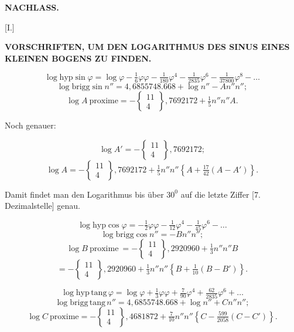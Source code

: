 
\clearpage{}




\begin{center}
\textbf{NACHLASS.}
\end{center}

\begin{center}
[I.]
\end{center}

\begin{center}
\textbf{VORSCHRIFTEN, UM DEN LOGARITHMUS DES SINUS EINES
KLEINEN BOGENS ZU FINDEN.}
\end{center}

\[
\log\mathrm{hyp}\sin\varphi = \log\varphi - \tfrac{1}{6}\varphi\varphi - \tfrac{1}{180}\varphi^4 - \tfrac{1}{2835}\varphi^6 - \tfrac{1}{37800}\varphi^8 - \ldots
\]
\[
\log\mathrm{brigg}\sin n'' = 4{,}6855748.668 + \log n'' - An''n'';
\]
\[
\log A\ \mathrm{proxime} = -\left\{\!\begin{smallmatrix}11\\4\end{smallmatrix}\!\right\}{,}7692172 + \tfrac{1}{5}n''n''A.
\]

Noch genauer:

\[
\log A' = -\left\{\!\begin{smallmatrix}11\\4\end{smallmatrix}\!\right\}{,}7692172;
\]
\[
\log A = -\left\{\!\begin{smallmatrix}11\\4\end{smallmatrix}\!\right\}{,}7692172 + \tfrac{1}{5}n''n''\left\{A+\tfrac{17}{42}(A-A')\right\}.
\]

Damit findet man den Logarithmus bis über $30^0$ auf die letzte Ziffer [7. Dezimalstelle] genau.

\[
\log\mathrm{hyp}\cos\varphi = -\tfrac{1}{2}\varphi\varphi - \tfrac{1}{12}\varphi^4 - \tfrac{1}{45}\varphi^6 - \ldots
\]
\[
\log\mathrm{brigg}\cos n'' = -Bn''n'';
\]
\[
\log B\ \mathrm{proxime}\ = -\left\{\!\begin{smallmatrix}11\\4\end{smallmatrix}\!\right\}{,}2920960 + \tfrac{1}{3}n''n''B
\]
\[
= -\left\{\!\begin{smallmatrix}11\\4\end{smallmatrix}\!\right\}{,}2920960 + \tfrac{1}{3}n''n''\left\{B+\tfrac{1}{10}(B-B')\right\}.
\]

\[
\log\mathrm{hyp}\,\mathrm{tang}\,\varphi = \log\varphi + \tfrac{1}{3}\varphi\varphi + \tfrac{7}{90}\varphi^4 + \tfrac{62}{2835}\varphi^6 + \ldots
\]
\[
\log\mathrm{brigg}\,\mathrm{tang}\,n'' = 4{,}6855748.668 + \log n'' + Cn''n'';
\]
\[
\log C\ \mathrm{proxime} = -\left\{\!\begin{smallmatrix}11\\4\end{smallmatrix}\!\right\}{,}4681872 + \tfrac{7}{10}n''n''\left\{C-\tfrac{599}{2058}(C-C')\right\}. 
\]
